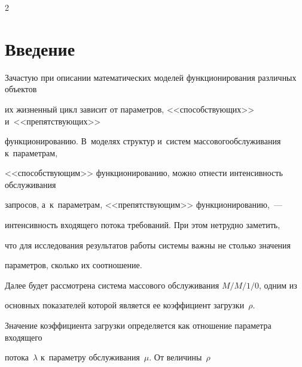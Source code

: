 \vspace*{-9pt}













\thispagestyle{headings}





\begin{multicols}{2}





\label{st\stat}





\section{Введение}





Зачастую при описании математических мо\-де\-лей функционирования различных объектов 


их жизненный цикл зависит от параметров, <<способствующих>> и~<<препятствующих>> 


функционированию. В~моделях структур и~систем массового\linebreak обслуживания к~параметрам, 


<<способствующим>> функционированию, можно отнести интенсивность обслуживания 


запросов, а~к~параметрам, <<препятствующим>> функционированию,~--- 


интенсивность входящего потока требований. При этом нетрудно заметить, 


что для исследования результатов работы системы важны не столько значения 


параметров, сколько их соотношение.





Далее будет рассмотрена система массового обслужи\-вания $M/M/1/0$, одним из 


основных показателей которой является ее коэффициент загрузки~$\rho$. 


Значение коэффициента загрузки определяется как отношение параметра входящего 


потока~$\lambda$ к~па\-ра\-мет\-ру обслуживания~$\mu$. От величины~$\rho$ 



\end{multicols}
